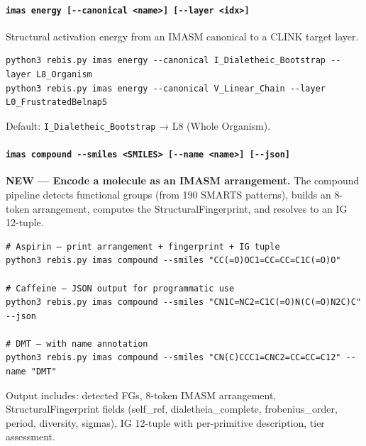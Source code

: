\documentclass[12pt,a4paper]{article}
\begin{document}
\hypertarget{imas-energy---canonical-name---layer-idx}{%
\paragraph{\texorpdfstring{\texttt{imas\ energy\ {[}-\/-canonical\ \textless{}name\textgreater{}{]}\ {[}-\/-layer\ \textless{}idx\textgreater{}{]}}}{imas energy {[}-\/-canonical \textless name\textgreater{]} {[}-\/-layer \textless idx\textgreater{]}}}\label{imas-energy---canonical-name---layer-idx}}

Structural activation energy from an IMASM canonical to a CLINK target
layer.

\begin{verbatim}
python3 rebis.py imas energy --canonical I_Dialetheic_Bootstrap --layer L8_Organism
python3 rebis.py imas energy --canonical V_Linear_Chain --layer L0_FrustratedBelnap5
\end{verbatim}

Default: \texttt{I\_Dialetheic\_Bootstrap} → L8 (Whole Organism).

\hypertarget{imas-compound---smiles-smiles---name-name---json}{%
\paragraph{\texorpdfstring{\texttt{imas\ compound\ -\/-smiles\ \textless{}SMILES\textgreater{}\ {[}-\/-name\ \textless{}name\textgreater{}{]}\ {[}-\/-json{]}}}{imas compound -\/-smiles \textless SMILES\textgreater{} {[}-\/-name \textless name\textgreater{]} {[}-\/-json{]}}}\label{imas-compound---smiles-smiles---name-name---json}}

\textbf{NEW --- Encode a molecule as an IMASM arrangement.} The compound
pipeline detects functional groups (from 190 SMARTS patterns), builds an
8-token arrangement, computes the StructuralFingerprint, and resolves to
an IG 12-tuple.

\begin{verbatim}
# Aspirin — print arrangement + fingerprint + IG tuple
python3 rebis.py imas compound --smiles "CC(=O)OC1=CC=CC=C1C(=O)O"

# Caffeine — JSON output for programmatic use
python3 rebis.py imas compound --smiles "CN1C=NC2=C1C(=O)N(C(=O)N2C)C" --json

# DMT — with name annotation
python3 rebis.py imas compound --smiles "CN(C)CCC1=CNC2=CC=CC=C12" --name "DMT"
\end{verbatim}

Output includes: detected FGs, 8-token IMASM arrangement,
StructuralFingerprint fields (self\_ref, dialetheia\_complete,
frobenius\_order, period, diversity, sigmas), IG 12-tuple with
per-primitive description, tier assessment.
\end{document}
